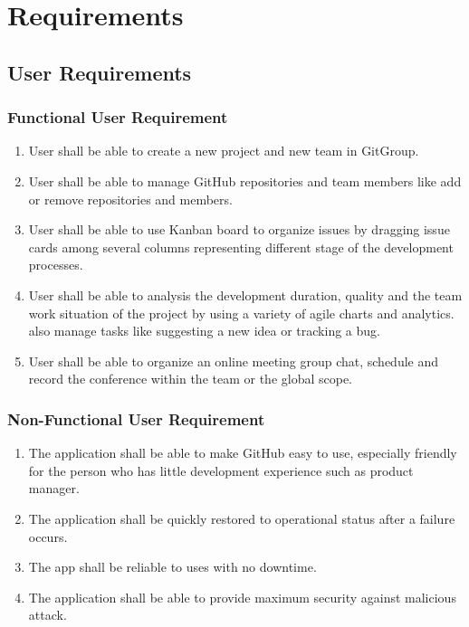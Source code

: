\documentclass[12pt,a4paper]{report}
\begin{document}
\chapter{Requirements}
\section{User Requirements}
	\subsection{Functional User Requirement}
		\begin{enumerate}
			\renewcommand{\labelenumi}{{\textbf{\arabic{enumi}.}}}
			\item User shall be able to create a new project and new team in GitGroup.
			\item User shall be able to manage GitHub repositories and team members like add or remove repositories and members.
			\item User shall be able to use Kanban board to organize issues by dragging issue cards among several columns representing different stage of the development processes.
			\item User shall be able to analysis the development duration, quality and the team work situation of the project by using a variety of agile charts and analytics.
			also manage tasks like suggesting a new idea or tracking a bug. 
			\item User shall be able to organize an online meeting group chat, schedule and record the conference within the team or the global scope.
		\end{enumerate}
	\subsection{Non-Functional User Requirement}
		\begin{enumerate}
			\renewcommand{\labelenumi}{{\textbf{\arabic{enumi}.}}}
			\item The application shall be able to make GitHub easy to use, especially friendly for the person who has little development experience such as product manager.
			\item The application shall be quickly restored to operational status after a failure occurs.
			\item The app shall be reliable to uses with no downtime.
			\item The application shall be able to provide maximum security against malicious attack.
		\end{enumerate}
\end{document}

